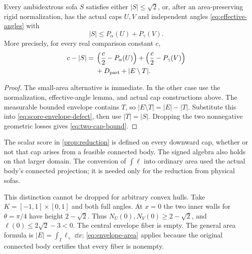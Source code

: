 \begin{proposition}\label{prop:reduction}
Every ambidextrous sofa $S$ satisfies either $|S|\le\sqrt2$, or,
after an area-preserving rigid normalization, has the actual caps
$U,V$ and independent angles \eqref{eq:effective-angles} with
\begin{equation}\label{eq:two-cap-bound}
 |S|\le P_\alpha(U)+P_\gamma(V).
\end{equation}
More precisely, for every real comparison constant $c$,
\begin{equation}\label{eq:four-term-deficit}
 \begin{split}
 c-|S|={}&\left(\frac c2-P_\alpha(U)\right)
          +\left(\frac c2-P_\gamma(V)\right)\\
         &+D_{\rm part}+|E\setminus T|.
 \end{split}
\end{equation}
\end{proposition}

\begin{proof}
The small-area alternative is immediate. In the other case use the
normalization, effective-angle lemma, and actual cap constructions
above. The measurable bounded envelope contains $T$, so
$|E\setminus T|=|E|-|T|$. Substitute this into
\eqref{eq:score-envelope-defect}, then use $|T|=|S|$.
Dropping the two nonnegative geometric losses gives
\eqref{eq:two-cap-bound}.
\end{proof}

The scalar score in \cref{prop:reduction} is defined on every downward
cap, whether or not that cap arises from a feasible connected body.
The signed algebra also holds on that larger domain. The conversion
of $\int\ell$ into ordinary area used the actual body's connected
projection; it is needed only for the reduction from physical sofas.

\begin{remark}\label{rem:negative-fibers}
This distinction cannot be dropped for arbitrary convex hulls.
Take $K=[-1,1]\times[0,1]$ and both full angles. At $x=0$ the two
inner walls for $\theta=\pi/4$ have height $2-\sqrt2$.
Thus $N_U(0),N_V(0)\ge2-\sqrt2$, and
$\ell(0)\le2\sqrt2-3<0$. The central envelope fiber is empty.
The general area formula is $|E|=\int_I\ell_+\,\dd x$;
\eqref{eq:envelope-area} applies because the original connected body
certifies that every fiber is nonempty.
\end{remark}
